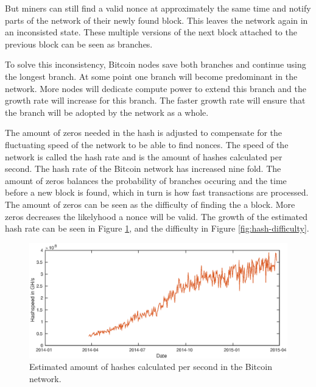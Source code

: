 But miners can still find a valid nonce at approximately the same time
and notify parts of the network of their newly found block.
This leaves the network again in an inconsisted state.
These multiple versions of the next block attached to the previous block can be seen as branches.

To solve this inconsistency, Bitcoin nodes save both branches and continue using the longest branch.
At some point one branch will become predominant in the network.
More nodes will dedicate compute power to extend this branch and the growth rate will increase for this branch.
The faster growth rate will ensure that the branch will be adopted by the network as a whole.

The amount of zeros needed in the hash is adjusted to compensate for the fluctuating speed of the network to be able to find nonces.
The speed of the network is called the hash rate and is the amount of hashes calculated per second.
The hash rate of the Bitcoin network has increased nine fold.
The amount of zeros balances the probability of branches occuring
and the time before a new block is found,
which in turn is how fast transactions are processed.
The amount of zeros can be seen as the difficulty of finding the a block.
More zeros decreases the likelyhood a nonce will be valid.
The growth of the estimated hash rate can be seen in Figure \ref{fig:hash-speed},
and the difficulty in Figure \ref{fig:hash-difficulty}.

\begin{figure}
        \centerline{\includegraphics[scale=0.6]{relatedWork/figs/hashspeed/hashspeed.eps}}
        \caption{Estimated amount of hashes calculated per second in the Bitcoin network.\cite{Blockchain.info-hashspeed}}
	\label{fig:hash-speed}
\end{figure}

